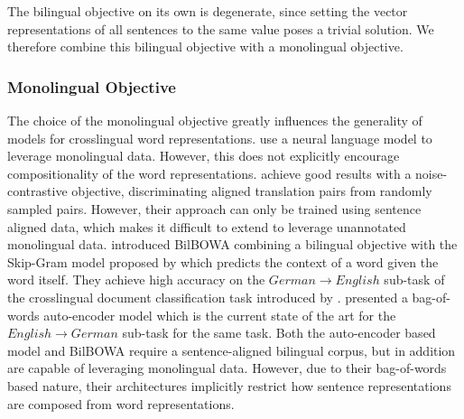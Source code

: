\documentclass{article} \usepackage{iclr2015,times}
\begin{document}
The bilingual objective on its own is degenerate, since setting the vector
representations of all sentences to the same value poses a trivial solution.
We therefore combine this bilingual objective with a monolingual objective.

\subsubsection{Monolingual Objective}

The choice of the monolingual objective greatly influences the
generality of models for crosslingual word representations.
\citet{klementiev2012inducing} use a neural language model to
leverage monolingual data.
However, this does not explicitly encourage compositionality of the 
word representations.
\citet{hermann2014multilingual} achieve good results with a noise-contrastive
objective, discriminating aligned translation pairs from randomly sampled pairs.
However, their approach can only be trained using sentence aligned data,
which makes it difficult to extend to leverage unannotated monolingual data.
\citet{gouws2014bilbowa} introduced BilBOWA combining a bilingual
objective with the Skip-Gram model proposed by \citet{mikolov2013efficient}
which predicts the context of a word given the word itself.
They achieve high accuracy on the $German\rightarrow English$ sub-task of
the crosslingual document classification task introduced by
\citet{klementiev2012inducing}.
\citet{chandar2014autoencoder} presented a
bag-of-words auto-encoder model which is the current state of the art
for the $English\rightarrow German$
sub-task for the same task.
Both the auto-encoder based model and BilBOWA require a sentence-aligned
bilingual corpus, but in addition are capable of leveraging
monolingual data.
However, due to their bag-of-words based nature, their architectures implicitly
restrict how sentence representations are composed from word representations.
\end{document}
